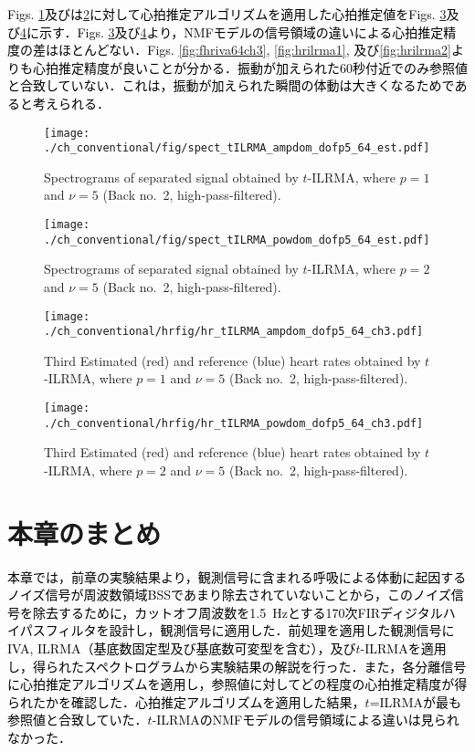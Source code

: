 \textcolor{black}{Figs. \ref{fig:stilrmaa5}及びは\ref{fig:stilrmap5}に対して心拍推定アルゴリズムを適用した心拍推定値をFigs. \ref{fig:hrtilrmaa5}及び\ref{fig:hrtilrmap5}に示す．Figs. \ref{fig:hrtilrmaa5}及び\ref{fig:hrtilrmap5}より，NMFモデルの信号領域の違いによる心拍推定精度の差はほとんどない．Figs. \ref{fig:fhriva64ch3}, \ref{fig:hrilrma1}, 及び\ref{fig:hrilrma2}よりも心拍推定精度が良いことが分かる．振動が加えられた60秒付近でのみ参照値と合致していない．これは，振動が加えられた瞬間の体動は大きくなるためであると考えられる．}

\begin{figure}[tb]
\centering
\texttt{[image: ./ch\_conventional/fig/spect\_tILRMA\_ampdom\_dofp5\_64\_est.pdf]}
\caption{Spectrograms of separated signal obtained by $t$-ILRMA, where $p=1$ and $\nu=5$ (Back no.~2, high-pass-filtered).}
\label{fig:stilrmaa5}
\end{figure}

\begin{figure}[tb]
\centering
\texttt{[image: ./ch\_conventional/fig/spect\_tILRMA\_powdom\_dofp5\_64\_est.pdf]}
\caption{Spectrograms of separated signal obtained by $t$-ILRMA, where $p=2$ and $\nu=5$ (Back no.~2, high-pass-filtered).}
\label{fig:stilrmap5}
\end{figure}

\begin{figure}[tb]
\centering
\texttt{[image: ./ch\_conventional/hrfig/hr\_tILRMA\_ampdom\_dofp5\_64\_ch3.pdf]}
\caption{Third Estimated (red) and reference (blue) heart rates obtained by $t$-ILRMA, where $p=1$ and $\nu=5$ (Back no.~2, high-pass-filtered).}
\label{fig:hrtilrmaa5}
\end{figure}

\begin{figure}[tb]
\centering
\texttt{[image: ./ch\_conventional/hrfig/hr\_tILRMA\_powdom\_dofp5\_64\_ch3.pdf]}
\caption{Third Estimated (red) and reference (blue) heart rates obtained by $t$-ILRMA, where $p=2$ and $\nu=5$ (Back no.~2, high-pass-filtered).}
\label{fig:hrtilrmap5}
\end{figure}

\section{本章のまとめ}
\label{sec:conv:conclusion5}
\textcolor{black}{本章では，前章の実験結果より，観測信号に含まれる呼吸による体動に起因するノイズ信号が周波数領域BSSであまり除去されていないことから，このノイズ信号を除去するために，カットオフ周波数を1.5~Hzとする170次FIRディジタルハイパスフィルタを設計し，観測信号に適用した．前処理を適用した観測信号にIVA, ILRMA（基底数固定型及び基底数可変型を含む），及び$t$-ILRMAを適用し，得られたスペクトログラムから実験結果の解説を行った．また，各分離信号に心拍推定アルゴリズムを適用し，参照値に対してどの程度の心拍推定精度が得られたかを確認した．心拍推定アルゴリズムを適用した結果，$t$=ILRMAが最も参照値と合致していた．$t$-ILRMAのNMFモデルの信号領域による違いは見られなかった．}